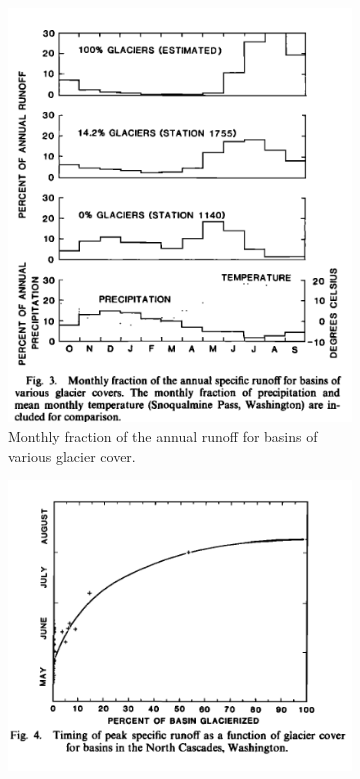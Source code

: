 \documentclass{article}
\begin{document}
\begin{figure}[h]
    \centering
    \begin{subfigure}[b]{0.45\textwidth}
        \centering
        \includegraphics[width=\textwidth]{Plots/fountain_1985_fig3.png}
        \caption{Monthly fraction of the annual runoff for basins of various glacier cover.}
        \label{fig:subfig1}
    \end{subfigure}
    \hfill
    \begin{subfigure}[b]{0.45\textwidth}
        \centering
        \includegraphics[width=\textwidth]{Plots/fountain_1985_fig4.png}

\end{subfigure}
\end{figure}
\end{document}

